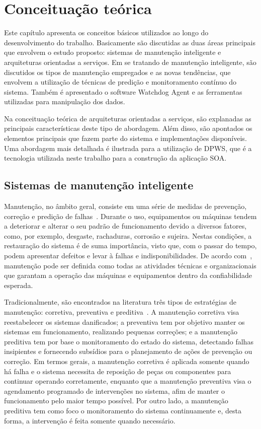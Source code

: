 \chapter{Conceituação teórica}

Este capítulo apresenta os conceitos básicos utilizados ao longo do desenvolvimento do trabalho.
Basicamente são discutidas as duas áreas principais que envolvem o estudo proposto: sistemas de
manutenção inteligente e arquiteturas orientadas a serviços. Em se tratando de manutenção
inteligente, são discutidos os tipos de manutenção empregados e as novas tendências, que envolvem a
utilização de técnicas de predição e monitoramento contínuo do sistema. Também é apresentado o
software Watchdog Agent e as ferramentas utilizadas para manipulação dos dados.

Na conceituação teórica de arquiteturas orientadas a serviços, são explanadas as principais
características deste tipo de abordagem. Além disso, são apontados os elementos principais que fazem
parte do sistema e implementações disponíveis. Uma abordagem mais detalhada é ilustrada para a
utilização de \gls{DPWS}, que é a tecnologia utilizada neste trabalho para a construção da aplicação
\gls{SOA}.


\section{Sistemas de manutenção inteligente}
\label{sec:manutencao-inteligente}

Manutenção, no âmbito geral, consiste em uma série de medidas de prevenção, correção e predição de
falhas~\cite{lee2006intelligent}. Durante o uso, equipamentos ou máquinas tendem a deteriorar e
alterar o seu padrão de funcionamento devido a diversos fatores, como, por exemplo, desgaste,
rachaduras, corrosão e sujeira. Nestas condições, a restauração do sistema é de suma importância,
visto que, com o passar do tempo, podem apresentar defeitos e levar à falhas e indisponibilidades.
De acordo com~\cite{marcal2005detectando}, manutenção pode ser definida como todas as atividades
técnicas e organizacionais que garantam a operação das máquinas e equipamentos dentro da
confiabilidade esperada.

Tradicionalmente, são encontrados na literatura três tipos de estratégias de
manutenção: corretiva, preventiva e preditiva~\cite{goncalves2011desenvolvimento}. A manutenção
corretiva visa reestabelecer os sistemas danificados; a preventiva tem por objetivo manter os
sistemas em funcionamento, realizando pequenas correções; e a manutenção preditiva tem por base o
monitoramento do estado do sistema, detectando falhas insipientes e fornecendo subsídios para o
planejamento de ações de prevenção ou correção. Em termos gerais, a manutenção corretiva é aplicada
somente quando há falha e o sistema necessita de reposição de peças ou componentes para continuar
operando corretamente, enquanto que a manutenção preventiva visa o agendamento programado de
intervenções no sistema, afim de manter o funcionamento pelo maior tempo possível. Por outro lado, a
manutenção preditiva tem como foco o monitoramento do sistema continuamente e, desta forma, a
intervenção é feita somente quando necessário.

